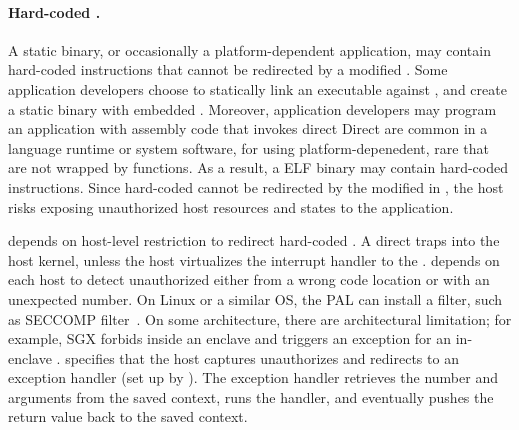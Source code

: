 \paragraph{Hard-coded \linuxapis{}.}
A static binary, or occasionally a platform-dependent application, may contain hard-coded  instructions
that cannot be redirected by a modified \libc{}.
Some application developers choose to statically link an executable against \libc{},
and create a static binary with embedded \linuxapis{}. %
Moreover, application developers may program an application
with assembly code that invokes direct \linuxapis{}
Direct \linuxapis{} are common in a language runtime or system software,
for using platform-depenedent,
rare \linuxapis{} that are not wrapped by \libc{} functions.
As a result, a ELF binary may contain hard-coded  instructions.
Since hard-coded \linuxapis{} cannot be redirected by the modified  in \glibc{},
the host risks exposing
unauthorized host resources and states
to the application.


\thelibos{} depends on host-level \linuxapi{} restriction to redirect hard-coded \linuxapis{}.
A direct \linuxapi{} traps into the host kernel,
unless the host virtualizes the interrupt handler to the \libos{}.
\graphene{} depends on each host to
detect unauthorized \linuxapis{} either from a wrong code location or with an unexpected \linuxapi{} number.
On Linux or a similar OS, the PAL can install a \linuxapi{} filter,
such as SECCOMP filter~\cite{seccomp}.
On some architecture, there are architectural limitation;
for example, SGX forbids \linuxapis{} inside an enclave and triggers an exception for an in-enclave \linuxapi{}.
\thehostabi{} specifies that the host captures unauthorizes \linuxapis{}
and redirects to an exception handler (set up by ).
The exception handler 
retrieves the \linuxapi{} number and arguments
from the saved context,
runs the \linuxapi{} handler,
and eventually pushes the return value back to the saved context. %


